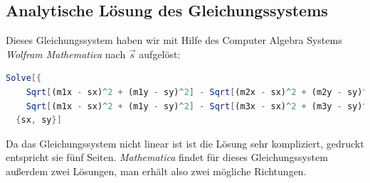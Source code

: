 \subsection{Analytische Lösung des Gleichungssystems}
Dieses Gleichungssystem haben wir mit Hilfe des Computer Algebra Systems \textit{Wolfram Mathematica}\cite{mathematica} nach $\vec{s}$ aufgelöst:
\begin{lstlisting}[language=Mathematica,caption={Befehl um das Gleichungsystem in \textit{Mathematica} zu lösen}]
  Solve[{
    Sqrt[(m1x - sx)^2 + (m1y - sy)^2] - Sqrt[(m2x - sx)^2 + (m2y - sy)^2] = dx12,
    Sqrt[(m1x - sx)^2 + (m1y - sy)^2] - Sqrt[(m3x - sx)^2 + (m3y - sy)^2] = dx13,}
  {sx, sy}]
\end{lstlisting}
Da das Gleichungssystem nicht linear ist ist die Lösung sehr kompliziert, gedruckt entspricht sie fünf Seiten. \textit{Mathematica} findet für dieses Gleichungssystem außerdem zwei Lösungen, man erhält also zwei mögliche Richtungen.
